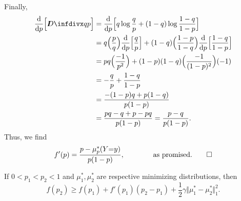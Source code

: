 \begin{lproof}
    Finally,
    \begin{align*}
        \frac{\mathrm d}{\mathrm d p} \Big[ \kldiv{q}{p} \Big]
        &= \frac{\mathrm d}{\mathrm d p}
            \Big[ q \log \frac{q}{p} + (1-q) \log \frac{1-q}{1-p} \Big] \\
        &= q \Big(\frac pq \Big) \frac{\mathrm d}{\mathrm d p} \Big[ \frac{q}{p}\Big]
            + (1-q)\Big(\frac{1-p}{1-q}\Big)  \frac{\mathrm d}{\mathrm d p} \Big[\frac{1-q}{1-p} \Big] \\
        &= pq \Big( \frac{-1}{p^2} \Big)
            + (1-p)(1-q) \Big( \frac{-1}{(1-p)^2} \Big)(-1) \\
        &= - \frac{q}{p}
            + \frac{1-q}{1-p} \\
        &= \frac{-(1-p)q + p(1-q)}{p(1-p)} \\
        &= \frac{pq - q + p - pq}{p(1-p)} 
        = \frac{p - q}{p(1-p)}.
    \end{align*}
    Thus, we find
    \[
        f'(p) = \frac{p - \mu^*_p(Y{=}y)}{p(1-p)},
        \qquad\qquad\text{as promised}. \qedhere
    \]
\end{lproof}
\begin{lemma} \label{lem:strongly-cvx-ish}
    If $0 < p_1 < p_2 < 1$
    and $\mu_1^*, \mu_2^*$ are respective minimizing distributions,
    then
    \[
        f(p_2) \ge f(p_1) + f'(p_1) (p_2-p_1) +
            \frac 12\gamma
            \Vert \mu_1^* - \mu_2^* \Vert_1^2
            .
    \]
\end{lemma}
